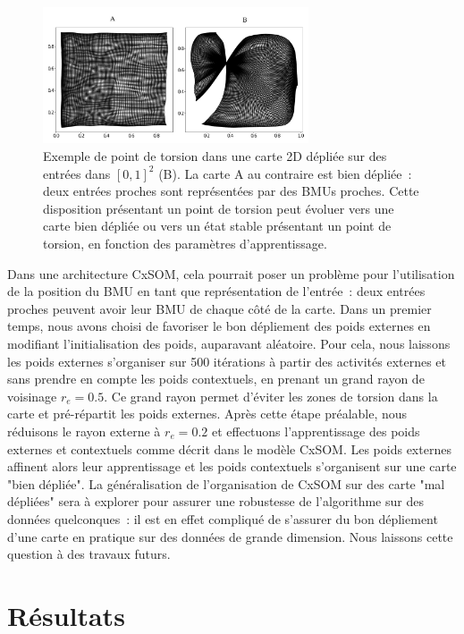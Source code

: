 \documentclass[../main]{subfiles}
\begin{document}
\begin{figure}
	\centering\includegraphics[width=0.7\textwidth]{we_cub_example.pdf}
	\caption{Exemple de point de torsion dans une carte 2D dépliée sur des entrées dans $[0,1]^2$ (B). La carte A au contraire est bien dépliée~: deux entrées proches sont représentées par des BMUs proches. Cette disposition présentant un point de torsion peut évoluer vers une carte bien dépliée ou vers un état stable présentant un point de torsion, en fonction des paramètres d'apprentissage. \label{fig:torsion}
	}
\end{figure}

Dans une architecture CxSOM, cela pourrait poser un problème pour l'utilisation de la position du BMU en tant que représentation de l'entrée~: deux entrées proches peuvent avoir leur BMU de chaque côté de la carte.
Dans un premier temps, nous avons choisi de favoriser le bon dépliement des poids externes en modifiant l'initialisation des poids, auparavant aléatoire. Pour cela, nous laissons les poids externes s'organiser sur 500 itérations à partir des activités externes et sans prendre en compte les poids contextuels, en prenant un grand rayon de voisinage $r_e = 0.5$. 
Ce grand rayon permet d'éviter les zones de torsion dans la carte et pré-répartit les poids externes. Après cette étape préalable, nous réduisons le rayon externe  à $r_e = 0.2$ et effectuons l'apprentissage des poids externes et contextuels comme décrit dans le modèle CxSOM. Les poids externes affinent alors leur apprentissage et les poids contextuels s'organisent sur une carte "bien dépliée".
La généralisation de l'organisation de CxSOM sur des carte "mal dépliées" sera à explorer pour assurer une robustesse de l'algorithme sur des données quelconques~: il est en effet compliqué de s'assurer du bon dépliement d'une carte en pratique sur des données de grande dimension. Nous laissons cette question à des travaux futurs.

\section{Résultats}
\end{document}
